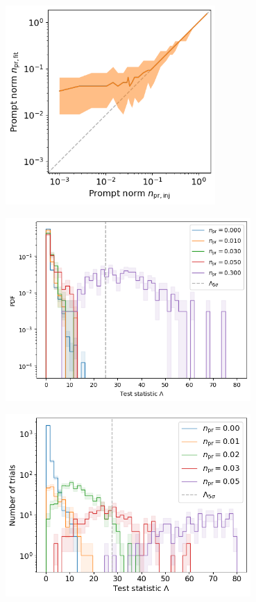 \documentclass[aspectratio=1610, 9pt]{beamer}
\begin{document}
\begin{frame}
    \includegraphics[width=0.6\textwidth]{../Plots/bias}
\end{frame}
\begin{frame}
    \includegraphics[width=0.7\textwidth]{../Plots/test_statistic}
\end{frame}
\begin{frame}
\includegraphics[width=0.7\textwidth]{../Plots/test_statisti_previous}
\end{frame}
\end{document}
